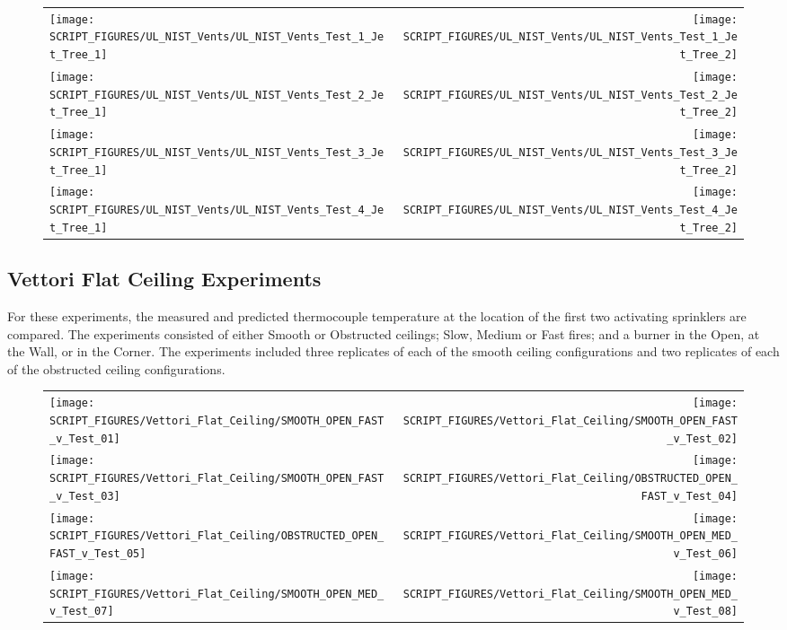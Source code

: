 \newpage

\begin{figure}[p]
\begin{tabular*}{\textwidth}{l@{\extracolsep{\fill}}r}
\texttt{[image: SCRIPT\_FIGURES/UL\_NIST\_Vents/UL\_NIST\_Vents\_Test\_1\_Jet\_Tree\_1]} &
\texttt{[image: SCRIPT\_FIGURES/UL\_NIST\_Vents/UL\_NIST\_Vents\_Test\_1\_Jet\_Tree\_2]} \\
\texttt{[image: SCRIPT\_FIGURES/UL\_NIST\_Vents/UL\_NIST\_Vents\_Test\_2\_Jet\_Tree\_1]} &
\texttt{[image: SCRIPT\_FIGURES/UL\_NIST\_Vents/UL\_NIST\_Vents\_Test\_2\_Jet\_Tree\_2]} \\
\texttt{[image: SCRIPT\_FIGURES/UL\_NIST\_Vents/UL\_NIST\_Vents\_Test\_3\_Jet\_Tree\_1]} &
\texttt{[image: SCRIPT\_FIGURES/UL\_NIST\_Vents/UL\_NIST\_Vents\_Test\_3\_Jet\_Tree\_2]} \\
\texttt{[image: SCRIPT\_FIGURES/UL\_NIST\_Vents/UL\_NIST\_Vents\_Test\_4\_Jet\_Tree\_1]} &
\texttt{[image: SCRIPT\_FIGURES/UL\_NIST\_Vents/UL\_NIST\_Vents\_Test\_4\_Jet\_Tree\_2]}
\end{tabular*}
\label{UL_NIST_Ceiling_Jet}
\end{figure}


\clearpage

\subsection{Vettori Flat Ceiling Experiments}
\label{Vettori_Flat_Results}

For these experiments, the measured and predicted thermocouple temperature at the location of the first two activating sprinklers are compared. The experiments consisted of either Smooth or Obstructed ceilings; Slow, Medium or Fast fires; and a burner in the Open, at the Wall, or in the Corner.
The experiments included three replicates of each of the smooth ceiling configurations and two replicates of each of the obstructed ceiling configurations.

\newpage

\begin{figure}[p]
\begin{tabular*}{\textwidth}{l@{\extracolsep{\fill}}r}
\texttt{[image: SCRIPT\_FIGURES/Vettori\_Flat\_Ceiling/SMOOTH\_OPEN\_FAST\_v\_Test\_01]} &
\texttt{[image: SCRIPT\_FIGURES/Vettori\_Flat\_Ceiling/SMOOTH\_OPEN\_FAST\_v\_Test\_02]} \\
\texttt{[image: SCRIPT\_FIGURES/Vettori\_Flat\_Ceiling/SMOOTH\_OPEN\_FAST\_v\_Test\_03]} &
\texttt{[image: SCRIPT\_FIGURES/Vettori\_Flat\_Ceiling/OBSTRUCTED\_OPEN\_FAST\_v\_Test\_04]} \\
\texttt{[image: SCRIPT\_FIGURES/Vettori\_Flat\_Ceiling/OBSTRUCTED\_OPEN\_FAST\_v\_Test\_05]} &
\texttt{[image: SCRIPT\_FIGURES/Vettori\_Flat\_Ceiling/SMOOTH\_OPEN\_MED\_v\_Test\_06]} \\
\texttt{[image: SCRIPT\_FIGURES/Vettori\_Flat\_Ceiling/SMOOTH\_OPEN\_MED\_v\_Test\_07]} &
\texttt{[image: SCRIPT\_FIGURES/Vettori\_Flat\_Ceiling/SMOOTH\_OPEN\_MED\_v\_Test\_08]} \\
\end{tabular*}
\label{Vettori_1}
\end{figure}

